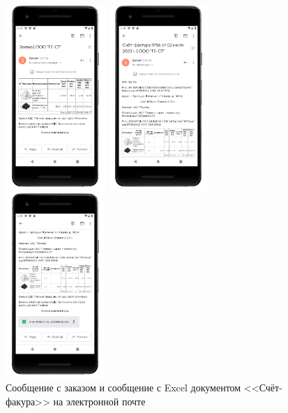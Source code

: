 \begin{figure}[!htb]\centering
    \begin{minipage}{0.25\textwidth}
        \centering

        \includegraphics[height=7cm]
        {images/mobile/order/order-email-1.png}
    \end{minipage}
    \begin{minipage}{0.25\textwidth}
        \centering

        \includegraphics[height=7cm]
        {images/mobile/order/order-email-2.png}
    \end{minipage}
    \begin{minipage}{0.25\textwidth}
        \centering

        \includegraphics[height=7cm]
        {images/mobile/order/order-email-3.png}
    \end{minipage}

    \caption{Сообщение с заказом и сообщение с Excel документом <<Счёт-факура>> на электронной почте}
    \label{fig:test_order_check}
\end{figure}


